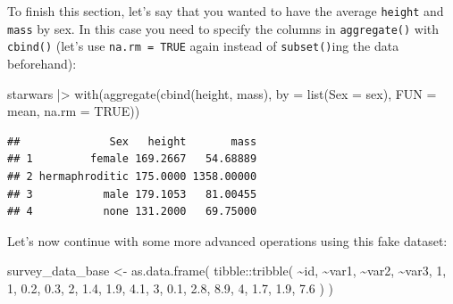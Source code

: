 \documentclass[
]{article}
\newenvironment{Shaded}{\begin{snugshade}}{\end{snugshade}}
\newcommand{\AttributeTok}[1]{\textcolor[rgb]{0.77,0.63,0.00}{#1}}
\newcommand{\ConstantTok}[1]{\textcolor[rgb]{0.00,0.00,0.00}{#1}}
\newcommand{\DecValTok}[1]{\textcolor[rgb]{0.00,0.00,0.81}{#1}}
\newcommand{\FloatTok}[1]{\textcolor[rgb]{0.00,0.00,0.81}{#1}}
\newcommand{\FunctionTok}[1]{\textcolor[rgb]{0.00,0.00,0.00}{#1}}
\newcommand{\NormalTok}[1]{#1}
\newcommand{\OtherTok}[1]{\textcolor[rgb]{0.56,0.35,0.01}{#1}}
\newcommand{\SpecialCharTok}[1]{\textcolor[rgb]{0.00,0.00,0.00}{#1}}
\begin{document}
To finish this section, let's say that you wanted to have the average \texttt{height} and \texttt{mass} by sex. In this case
you need to specify the columns in \texttt{aggregate()} with \texttt{cbind()} (let's use \texttt{na.rm\ =\ TRUE} again instead of
\texttt{subset()}ing the data beforehand):

\begin{Shaded}
\begin{Highlighting}[]
\NormalTok{starwars }\SpecialCharTok{|\textgreater{}}
  \FunctionTok{with}\NormalTok{(}\FunctionTok{aggregate}\NormalTok{(}\FunctionTok{cbind}\NormalTok{(height, mass),}
       \AttributeTok{by =} \FunctionTok{list}\NormalTok{(}\AttributeTok{Sex =}\NormalTok{ sex),}
       \AttributeTok{FUN =}\NormalTok{ mean, }\AttributeTok{na.rm =} \ConstantTok{TRUE}\NormalTok{))}
\end{Highlighting}
\end{Shaded}

\begin{verbatim}
##              Sex   height       mass
## 1         female 169.2667   54.68889
## 2 hermaphroditic 175.0000 1358.00000
## 3           male 179.1053   81.00455
## 4           none 131.2000   69.75000
\end{verbatim}

Let's now continue with some more advanced operations using this fake dataset:

\begin{Shaded}
\begin{Highlighting}[]
\NormalTok{survey\_data\_base }\OtherTok{\textless{}{-}} \FunctionTok{as.data.frame}\NormalTok{(}
\NormalTok{    tibble}\SpecialCharTok{::}\FunctionTok{tribble}\NormalTok{(}
        \SpecialCharTok{\textasciitilde{}}\NormalTok{id, }\SpecialCharTok{\textasciitilde{}}\NormalTok{var1, }\SpecialCharTok{\textasciitilde{}}\NormalTok{var2, }\SpecialCharTok{\textasciitilde{}}\NormalTok{var3,}
        \DecValTok{1}\NormalTok{, }\DecValTok{1}\NormalTok{, }\FloatTok{0.2}\NormalTok{, }\FloatTok{0.3}\NormalTok{,}
        \DecValTok{2}\NormalTok{, }\FloatTok{1.4}\NormalTok{, }\FloatTok{1.9}\NormalTok{, }\FloatTok{4.1}\NormalTok{,}
        \DecValTok{3}\NormalTok{, }\FloatTok{0.1}\NormalTok{, }\FloatTok{2.8}\NormalTok{, }\FloatTok{8.9}\NormalTok{,}
        \DecValTok{4}\NormalTok{, }\FloatTok{1.7}\NormalTok{, }\FloatTok{1.9}\NormalTok{, }\FloatTok{7.6}
\NormalTok{        )}
\NormalTok{)}
\end{Highlighting}
\end{Shaded}
\end{document}
